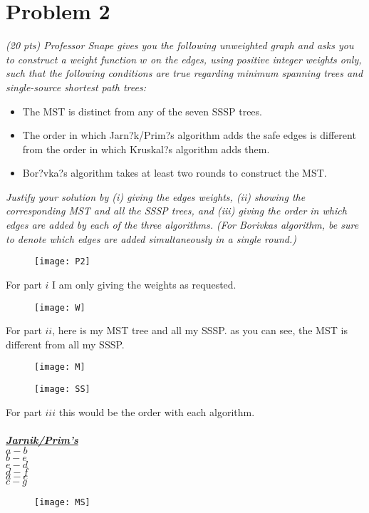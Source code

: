 \documentclass[12pt]{article} \setlength{\oddsidemargin}{0in}
\begin{document}
\newpage

\section*{Problem 2}

\textit{(20 pts) Professor Snape gives you the following unweighted graph and asks you to
construct a weight function $w$ on the edges, using positive integer weights only, such
that the following conditions are true regarding minimum spanning trees and single-source shortest path trees:}
\begin{itemize}
\item The MST is distinct from any of the seven SSSP trees.
\item The order in which Jarn?k/Prim?s algorithm adds the safe edges is different from the order in which Kruskal?s algorithm adds them.
\item Bor?vka?s algorithm takes at least two rounds to construct the MST.
\end{itemize}

\textit{Justify your solution by (i) giving the edges weights, (ii) showing the corresponding
MST and all the SSSP trees, and (iii) giving the order in which edges are added by
each of the three algorithms. (For Borivkas algorithm, be sure to denote which edges
are added simultaneously in a single round.)}

\begin{figure}[h]
  \centering \texttt{[image: P2]}
\end{figure}
 For part $i$ I am only giving the weights as requested. 

\begin{figure}[h]
  \centering \texttt{[image: W]}
\end{figure}
\newpage
For part $ii$, here is my MST tree and all my SSSP. as you can see, the MST is different from all my SSSP. 
\begin{figure}[h]
  \centering \texttt{[image: M]}
\end{figure}

\begin{figure}[h]
  \centering \texttt{[image: SS]}
\end{figure}
\newpage
For part $iii$ this would be the order with each algorithm.\\\\
\underline{\textbf{\textit{Jarnik/Prim's}}}\\
$a- b$\\
$b-e$\\
$e-d$\\
$d-f$\\
$a-c$\\
$c-g$
\begin{figure}[h]
  \centering \texttt{[image: MS]}
\end{figure}
\end{document}
